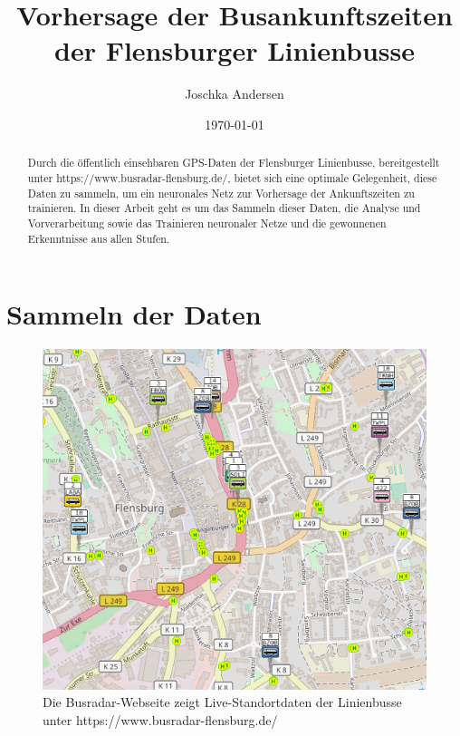 \documentclass[a4paper]{article}
\begin{document}
    \author{Joschka Andersen}
    \date{\today{}}

    \title{Vorhersage der Busankunftszeiten der Flensburger Linienbusse}

    \maketitle


    \begin{abstract}
        Durch die öffentlich einsehbaren GPS-Daten der Flensburger Linienbusse, bereitgestellt unter
        https://www.busradar-flensburg.de/, bietet sich eine optimale Gelegenheit, diese Daten zu sammeln, um ein
        neuronales Netz zur Vorhersage der Ankunftszeiten zu trainieren.
        In dieser Arbeit geht es um das Sammeln dieser Daten, die Analyse und Vorverarbeitung sowie das Trainieren
        neuronaler Netze und die gewonnenen Erkenntnisse aus allen Stufen.
    \end{abstract}


    \section{Sammeln der Daten}
    \label{sec:sammeln-der-daten}

    \begin{figure}[h]
        \includegraphics[scale=0.4]{figures/fig1_busradar}
        \centering
        \caption{Die Busradar-Webseite zeigt Live-Standortdaten der Linienbusse unter https://www.busradar-flensburg.de/}
        \label{fig:busradar}
    \end{figure}
\end{document}
